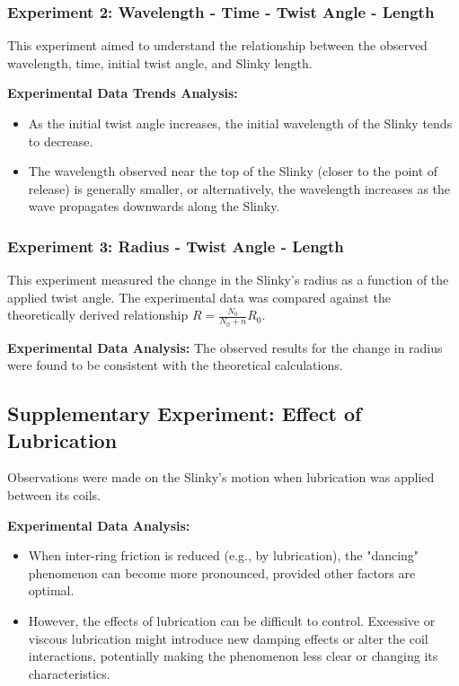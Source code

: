 \documentclass{mcmthesis}  %
\begin{document}
\subsubsection{Experiment 2: Wavelength - Time - Twist Angle - Length}
This experiment aimed to understand the relationship between the observed wavelength, time, initial twist angle, and Slinky length.

\textbf{Experimental Data Trends Analysis:}
\begin{itemize}
    \item As the initial twist angle increases, the initial wavelength of the Slinky tends to decrease.
    \item The wavelength observed near the top of the Slinky (closer to the point of release) is generally smaller, or alternatively, the wavelength increases as the wave propagates downwards along the Slinky.
\end{itemize}

\subsubsection{Experiment 3: Radius - Twist Angle - Length}
This experiment measured the change in the Slinky's radius as a function of the applied twist angle. The experimental data was compared against the theoretically derived relationship \(R = \frac{N_0}{N_0+n}R_0\).

\textbf{Experimental Data Analysis:} The observed results for the change in radius were found to be consistent with the theoretical calculations.

\subsection{Supplementary Experiment: Effect of Lubrication}
Observations were made on the Slinky's motion when lubrication was applied between its coils.

\textbf{Experimental Data Analysis:}
\begin{itemize}
    \item When inter-ring friction is reduced (e.g., by lubrication), the "dancing" phenomenon can become more pronounced, provided other factors are optimal.
    \item However, the effects of lubrication can be difficult to control. Excessive or viscous lubrication might introduce new damping effects or alter the coil interactions, potentially making the phenomenon less clear or changing its characteristics.
\end{itemize}
\end{document}
